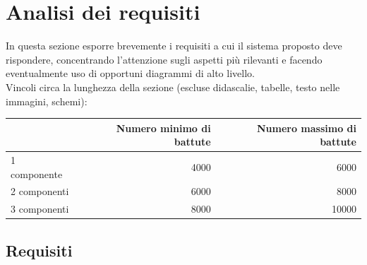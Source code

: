 \documentclass[12pt]{article}
\begin{document}
\newpage



\section{Analisi dei requisiti}

In questa sezione esporre brevemente i requisiti a cui il sistema proposto deve rispondere, concentrando l'attenzione sugli aspetti più rilevanti e facendo eventualmente uso di opportuni diagrammi di alto livello.\\

Vincoli circa la lunghezza della sezione (escluse didascalie, tabelle, testo nelle immagini, schemi):

\vspace{1cm}
\begin{tabular}{l|rr}
 & Numero minimo di battute & Numero massimo di battute \\
 \hline
 1 componente & 4000 & 6000 \\
 2 componenti & 6000 & 8000 \\
 3 componenti & 8000 & 10000 \\
 \hline
\end{tabular}


\newpage

\subsection{Requisiti}
\end{document}
